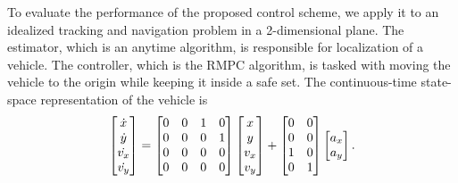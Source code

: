 To evaluate the performance of the proposed control scheme, we apply it to an idealized tracking and navigation problem in a 2-dimensional plane.
The estimator, which is an anytime algorithm, is responsible for localization of a vehicle. %
The controller, which is the RMPC algorithm, is tasked with moving the vehicle to the origin while keeping it inside a safe set.
The continuous-time state-space representation of the vehicle is
\begin{equation*}
\begin{bmatrix} \dot{x} \\ \dot{y} \\ \dot{v_x} \\ \dot{v_y} \end{bmatrix} = \begin{bmatrix} 0&0&1&0 \\ 0&0&0&1 \\0&0&0&0 \\0&0&0&0  \end{bmatrix}
\begin{bmatrix} x \\ y \\ v_x \\ v_y \end{bmatrix} +
\begin{bmatrix} 0&0 \\ 0&0 \\ 1&0 \\ 0&1 \end{bmatrix}
\begin{bmatrix} a_x \\ a_y \end{bmatrix} \text.
\end{equation*}
